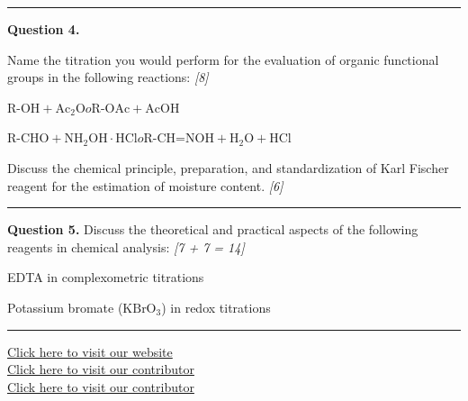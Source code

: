 \documentclass[11pt,a4paper]{article}
\newcommand{\pts}[1]{\hfill   \textit{[#1]}}
\begin{document}
\medskip\rule{\linewidth}{0.2pt}




\noindent   \textbf{Question 4.}

\begin{parts}
  \item Name the titration you would perform for the evaluation of organic functional groups in the following reactions: \pts{8}
  
\begin{parts}
    \item $ \text{R-OH} +  \text{Ac}_2 \text{O}  o  \text{R-OAc} +  \text{AcOH}$
    \item $ \text{R-CHO} +  \text{NH}_2 \text{OH}\cdot \text{HCl}  o  \text{R-CH=NOH} +  \text{H}_2 \text{O} +  \text{HCl}$
  \end{parts}
  \item Discuss the chemical principle, preparation, and standardization of Karl Fischer reagent for the estimation of moisture content. \pts{6}
\end{parts}

\medskip\rule{\linewidth}{0.2pt}




\noindent   \textbf{Question 5.} Discuss the theoretical and practical aspects of the following reagents in chemical analysis: \pts{7 + 7 = 14}

\begin{parts}
  \item EDTA in complexometric titrations
  \item Potassium bromate ($ \text{KBrO}_3$) in redox titrations
\end{parts}

\vfill
\rule{\linewidth}{0.4pt}

\begin{center}\small
  \href{https://bhu-exam.vercel.app/}{Click here to visit our website}\\[4pt]
  \href{https://me-aryan.vercel.app/}{Click here to visit our contributor}\\[4pt]
  \href{https://quashan-me.vercel.app/}{Click here to visit our contributor}
\end{center}
\end{document}
